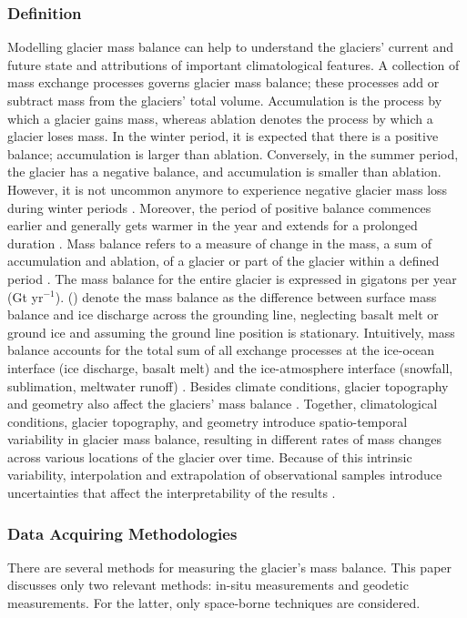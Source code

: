 \subsubsection{Definition}
Modelling glacier mass balance can help to understand the glaciers' current and future state and attributions of important climatological features. A collection of mass exchange processes governs glacier mass balance; these processes add or subtract mass from the glaciers' total volume. Accumulation is the process by which a glacier gains mass, whereas ablation denotes the process by which a glacier loses mass. In the winter period, it is expected that there is a positive balance; accumulation is larger than ablation. Conversely, in the summer period, the glacier has a negative balance, and accumulation is smaller than ablation. However, it is not uncommon anymore to experience negative glacier mass loss during winter periods \cite{soheb-2020}. Moreover, the period of positive balance commences earlier and generally gets warmer in the year and extends for a prolonged duration \cite{thibert-2013}. Mass balance refers to a measure of change in the mass, a sum of accumulation and ablation, of a glacier or part of the glacier within a defined period \cite{cogley-2011}. The mass balance for the entire glacier is expressed in gigatons per year (Gt yr$^{-1}$). \citeauthor{van-den-broeke-2020} (\citeyear{van-den-broeke-2020}) denote the mass balance as the difference between surface mass balance and ice discharge across the grounding line, neglecting basalt melt or ground ice and assuming the ground line position is stationary. Intuitively, mass balance accounts for the total sum of all exchange processes at the ice-ocean interface (ice discharge, basalt melt) and the ice-atmosphere interface (snowfall, sublimation, meltwater runoff) \cite{van-den-broeke-2020}. Besides climate conditions, glacier topography and geometry also affect the glaciers' mass balance \cite{fujita-2008, florentine-2018, huss-2012}. Together, climatological conditions, glacier topography, and geometry introduce spatio-temporal variability in glacier mass balance, resulting in different rates of mass changes across various locations of the glacier over time. Because of this intrinsic variability, interpolation and extrapolation of observational samples introduce uncertainties that affect the interpretability of the results \cite{ahlstrm-2015}.   

\clearpage

\subsubsection{Data Acquiring Methodologies}
There are several methods for measuring the glacier's mass balance. This paper discusses only two relevant methods: in-situ measurements and geodetic measurements. For the latter, only space-borne techniques are considered.

